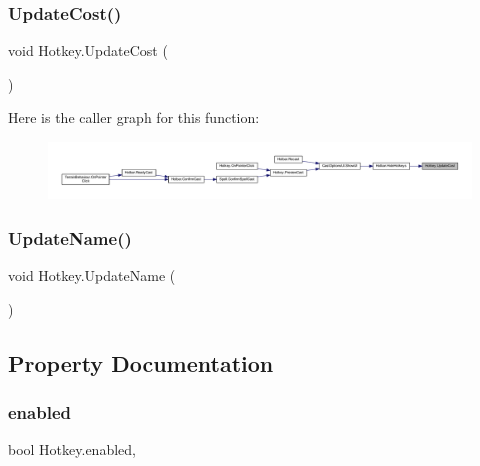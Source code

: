\subsubsection{\texorpdfstring{UpdateCost()}{UpdateCost()}}
{\footnotesize\ttfamily void Hotkey.\+Update\+Cost (\begin{DoxyParamCaption}{ }\end{DoxyParamCaption})}

Here is the caller graph for this function\+:\nopagebreak
\begin{figure}[H]
\begin{center}
\leavevmode
\includegraphics[width=350pt]{class_hotkey_a15822d970e7f05f8ea8ef4069a4e245a_icgraph}
\end{center}
\end{figure}
\mbox{\label{class_hotkey_a414aefec4d51bfa4b6fc68fcb8dce841}} 
\subsubsection{\texorpdfstring{UpdateName()}{UpdateName()}}
{\footnotesize\ttfamily void Hotkey.\+Update\+Name (\begin{DoxyParamCaption}{ }\end{DoxyParamCaption})}



\subsection{Property Documentation}
\mbox{\label{class_hotkey_a91d3325ffb1aa3fd83dbe59f6630b796}} 
\subsubsection{\texorpdfstring{enabled}{enabled}}
{\footnotesize\ttfamily bool Hotkey.\+enabled\hspace{0.3cm}{\ttfamily [get]}, {\ttfamily [set]}}

\mbox{\label{class_hotkey_aff210fac7bfb6cfdf469b02d6cd7e71a}} 
